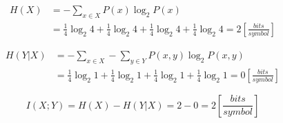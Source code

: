 {    \begin{equation*}
    \begin{aligned}
        H(X) &= -\sum_{x \in X} P(x) \log_2 {P(x)} \\
        &= \frac{1}{4}\log_2 4 + \frac{1}{4}\log_2 4 + \frac{1}{4}\log_2 4 + \frac{1}{4}\log_2 4
    = 2 [\frac{bits}{symbol}]
    \end{aligned}
    \end{equation*}
    
    \begin{equation*}
    \begin{aligned}
        H(Y|X) &= -\sum_{x \in X}-\sum_{y \in Y} P(x,y) \log_2 {P(x,y)} \\
        &= \frac{1}{4}\log_2 1 + \frac{1}{4}\log_2 1 + \frac{1}{4}\log_2 1 + \frac{1}{4}\log_2 1
    = 0 [\frac{bits}{symbol}]
    \end{aligned}
    \end{equation*}
        
    \begin{equation*}
        I(X;Y) = H(X) - H(Y|X) = 2 - 0 = 2 [\frac{bits}{symbol}]
    \end{equation*}
}